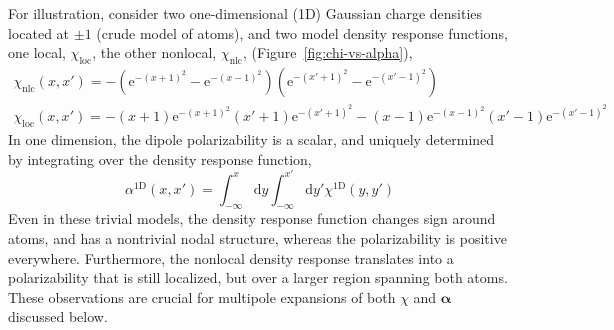For illustration, consider two one-dimensional (1D) Gaussian charge densities located at $\pm 1$ (crude model of atoms), and two model density response functions, one local, $\chi_\text{loc}$, the other nonlocal, $\chi_\text{nlc}$, (Figure~\ref{fig:chi-vs-alpha}),
\begin{equation}
\begin{gathered}
\chi_\text{nlc}(x,x')=-(\mathrm e^{-(x+1)^2}-\mathrm e^{-(x-1)^2})(\mathrm e^{-(x'+1)^2}-\mathrm e^{-(x'-1)^2}) \\
\chi_\text{loc}(x,x')=-(x+1)\mathrm e^{-(x+1)^2}(x'+1)\mathrm e^{-(x'+1)^2}-(x-1)\mathrm e^{-(x-1)^2}(x'-1)\mathrm e^{-(x'-1)^2}
\end{gathered}
\label{eq:model-responses}
\end{equation}
In one dimension, the dipole polarizability is a scalar, and uniquely determined by integrating over the density response function,
\begin{equation}
\alpha^\text{1D}(x,x')=\int_{-\infty}^x\mathrm dy\int_{-\infty}^{x'}\mathrm dy'\chi^\text{1D}(y,y')
\end{equation}
Even in these trivial models, the density response function changes sign around atoms, and has a nontrivial nodal structure, whereas the polarizability is positive everywhere.
Furthermore, the nonlocal density response translates into a polarizability that is still localized, but over a larger region spanning both atoms.
These observations are crucial for multipole expansions of both $\chi$ and $\boldsymbol\alpha$ discussed below.

